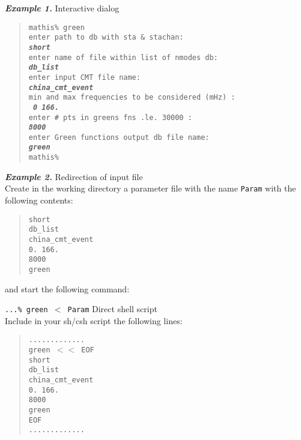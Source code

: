 {\bf\emph{Example 1.}} Interactive dialog
\begin{quote}
\texttt{mathis\% green \\
enter path to db with sta \& stachan: \\
{\bf \emph{short}} \\
enter name of file within list of nmodes db: \\
{\bf \emph{db\_list}} \\
enter input CMT file name: \\
{\bf \emph{china\_cmt\_event}} \\
min and max frequencies to be considered (mHz) : \\
{\bf \emph{ 0 166.}} \\
enter \# pts in greens fns .le.  30000 : \\
{\bf \emph{8000}} \\
enter Green functions output db file name: \\
{\bf \emph{green}} \\
mathis\%  }
\end{quote}
{\bf\emph{Example 2.}} Redirection of input file \\
Create in the working directory a parameter file with the name {\tt Param} with
the following contents:
\begin{quote}
\texttt{short \\
db\_list \\
china\_cmt\_event \\
 0.  166. \\
8000 \\
green }
\end{quote}
and start the following command:

\texttt{...\% green $<$ Param}
 Direct shell script \\
Include in your sh/csh script the following lines:
\begin{quote}
\texttt{............. \\
green $<<$ EOF \\
short \\
db\_list \\
china\_cmt\_event \\
 0.  166. \\
8000 \\
green \\
EOF \\
............. }
\end{quote}
%
%
\newpage

